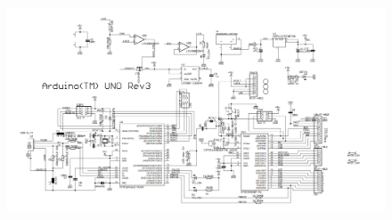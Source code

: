 \documentclass[10pt,twoside]{report}
\begin{document}
\begin{appendices}
\newpage
\begin{figure}
        \includegraphics[width=\textwidth]{ArduinoStroomschema.png}
\end{figure}

\end{appendices}
\end{document}
